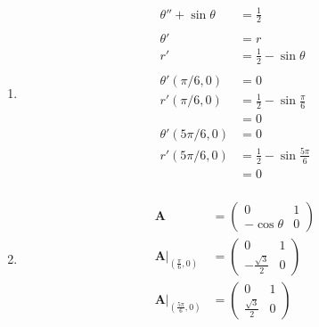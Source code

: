 \documentclass{article}
\begin{document}
\begin{enumerate}
  \item

        \begin{align*}
          \theta'' + \sin \theta & = \frac{1}{2}                        \\ \\
          \theta'                & = r                                  \\
          r'                     & = \frac{1}{2} - \sin \theta          \\ \\
          \theta'(\pi / 6, 0)    & = 0                                  \\
          r'(\pi / 6, 0)         & = \frac{1}{2} - \sin \frac{\pi}{6}   \\
                                 & = 0                                  \\
          \theta'(5 \pi / 6, 0)  & = 0                                  \\
          r'(5 \pi / 6, 0)       & = \frac{1}{2} - \sin \frac{5 \pi}{6} \\
                                 & = 0                                  \\
        \end{align*}

  \item

        \begin{align*}
          \mathbf{A}                                                    & = \begin{pmatrix}
                                                                              0            & 1 \\
                                                                              -\cos \theta & 0
                                                                            \end{pmatrix}                      \\
          \left. \mathbf{A} \right|_{\left( \frac{\pi}{6}, 0 \right)}   & = \begin{pmatrix}
                                                                              0                   & 1 \\
                                                                              -\frac{\sqrt{3}}{2} & 0
                                                                            \end{pmatrix} \\
          \left. \mathbf{A} \right|_{\left( \frac{5 \pi}{6}, 0 \right)} & = \begin{pmatrix}
                                                                              0                  & 1 \\
                                                                              \frac{\sqrt{3}}{2} & 0
                                                                            \end{pmatrix}
        \end{align*}


\end{enumerate}
\end{document}
